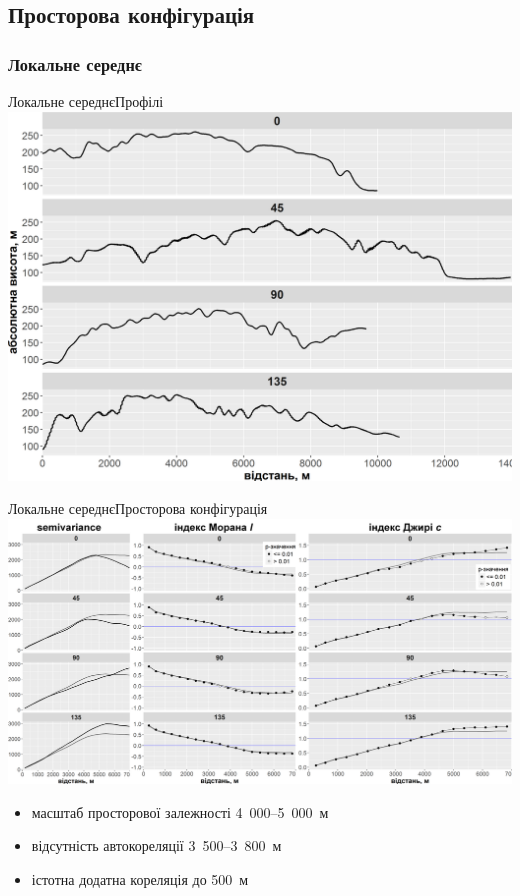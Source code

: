 \documentclass[]{beamer}
\begin{document}
\subsection{Просторова конфігурація}
\subsubsection{Локальне середнє}
\begin{frame}{Локальне середнє}{Профілі}
	\includegraphics[width=\textwidth]{./pres_figures/plots_mean/profiles_plot.png}%
\end{frame}

\begin{frame}{Локальне середнє}{Просторова конфігурація}
    \includegraphics[width=\textwidth]{./pres_figures/plots_mean/mean_all.png}%
    
    \begin{itemize}
    	\item масштаб просторової залежності 4~000--5~000~м
    	\item відсутність автокореляції 3~500--3~800~м
    	\item істотна додатна кореляція до 500~м
    \end{itemize}
\end{frame}
\end{document}
